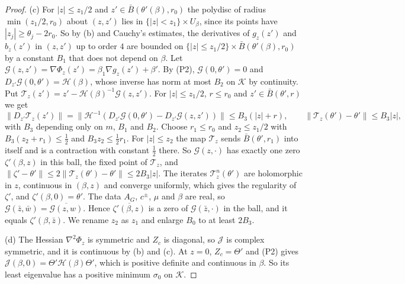 \begin{proof}
(c) For $|z|\le z_1/2$ and $z'\in\bar B(\theta'(\beta),r_0)$ the polydisc of radius
$\min(z_1/2,r_0)$ about $(z,z')$ lies in $\{|z|<z_1\}\times U_\beta$, since its points have
$|z_j|\ge\theta_j-2r_0$. So by (b) and Cauchy's estimates, the derivatives of $g_z(z')$ and
$b_z(z')$ in $(z,z')$ up to order $4$ are bounded on $\{|z|\le z_1/2\}\times\bar B(\theta'(\beta),r_0)$
by a constant $B_1$ that does not depend on $\beta$. Let
$\mathcal G(z,z')=\nabla\Phi_z(z')=\beta_1\nabla g_z(z')+\beta'$. By (P2), $\mathcal G(0,\theta')=0$ and
$D_{z'}\mathcal G(0,\theta')=\mathcal H(\beta)$, whose inverse has norm at most $B_2$ on $\mathcal K$ by
continuity. Put $\mathcal T_z(z')=z'-\mathcal H(\beta)^{-1}\mathcal G(z,z')$. For $|z|\le z_1/2$, $r\le r_0$ and
$z'\in\bar B(\theta',r)$ we get
\[
\lVert D_{z'}\mathcal T_z(z')\rVert=\lVert\mathcal H^{-1}(D_{z'}\mathcal G(0,\theta')-D_{z'}\mathcal G(z,z'))\rVert\le B_3(|z|+r),\qquad
\lVert \mathcal T_z(\theta')-\theta'\rVert\le B_3|z|,
\]
with $B_3$ depending only on $m$, $B_1$ and $B_2$. Choose $r_1\le r_0$ and $z_2\le z_1/2$ with
$B_3(z_2+r_1)\le\frac12$ and $B_3z_2\le\frac12r_1$. For $|z|\le z_2$ the map $\mathcal T_z$ sends
$\bar B(\theta',r_1)$ into itself and is a contraction with constant $\frac12$ there. So $\mathcal G(z,\cdot)$
has exactly one zero $\zeta'(\beta,z)$ in this ball, the fixed point of $\mathcal T_z$, and
$\lVert\zeta'-\theta'\rVert\le2\lVert \mathcal T_z(\theta')-\theta'\rVert\le2B_3|z|$. The iterates
$\mathcal T_z^n(\theta')$ are holomorphic in $z$, continuous in $(\beta,z)$ and converge uniformly, which
gives the regularity of $\zeta'$, and $\zeta'(\beta,0)=\theta'$. The data $A_G$, $c^\pm$, $\mu$
and $\beta$ are real, so $\mathcal G(\bar z,\bar w)=\overline{\mathcal G(z,w)}$. Hence
$\overline{\zeta'(\beta,z)}$ is a zero of $\mathcal G(\bar z,\cdot)$ in the ball, and it equals
$\zeta'(\beta,\bar z)$. We rename $z_2$ as $z_1$ and enlarge $B_0$ to at least $2B_3$.

(d) The Hessian $\nabla^2\Phi_z$ is symmetric and $Z_c$ is diagonal, so $\mathcal J$ is complex
symmetric, and it is continuous by (b) and (c). At $z=0$, $Z_c=\Theta'$ and (P2) gives
$\mathcal J(\beta,0)=\Theta'\mathcal H(\beta)\Theta'$, which is positive definite and continuous in
$\beta$. So its least eigenvalue has a positive minimum $\sigma_0$ on $\mathcal K$.


\end{proof}
